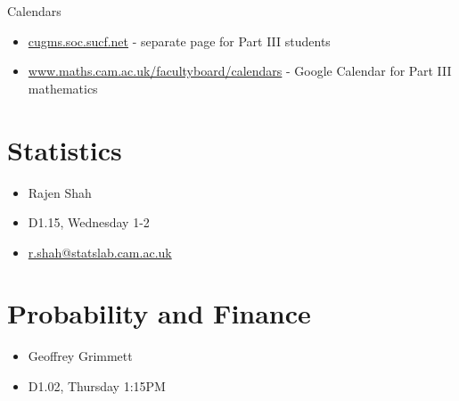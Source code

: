 Calendars

\begin{itemize}
\item \url{cugms.soc.sucf.net} - separate page for Part III students
\item \url{www.maths.cam.ac.uk/facultyboard/calendars} - Google
  Calendar for Part III mathematics
\end{itemize}


\section{Statistics}
\label{sec:statistics}

\begin{itemize}
\item Rajen Shah
\item D1.15, Wednesday 1-2
\item \url{r.shah@statslab.cam.ac.uk}
\end{itemize}

\section{Probability and Finance}
\label{sec:probability-finance}

\begin{itemize}
\item Geoffrey Grimmett
\item D1.02, Thursday 1:15PM
\end{itemize}

